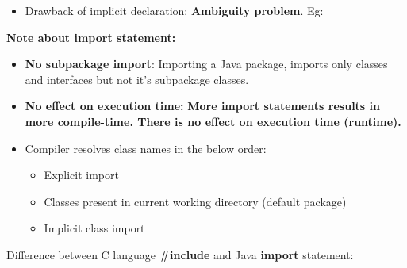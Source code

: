 \begin{flushleft}
\begin{itemize}
			
			\item Drawback of implicit declaration: \textbf{Ambiguity problem}. Eg:

		\end{itemize}
		
		\textbf{Note about import statement:}
		\begin{itemize}
			\item \textbf{No subpackage import}: Importing a Java package, imports only classes and interfaces but not it's subpackage classes.
			\item \textbf{No effect on execution time:} \textbf{More import statements results in more compile-time. There is no effect on execution time (runtime).}
			\item Compiler resolves class names in the below order:
			\begin{itemize}
				\item Explicit import
				\item Classes present in current working directory (default package)
				\item Implicit class import
			\end{itemize}	
		\end{itemize}
		
		Difference between C language \textbf{\#include} and Java \textbf{import} statement:
		\bigskip
		
		
		

		
		
		
				

	
\end{flushleft}

\newpage

